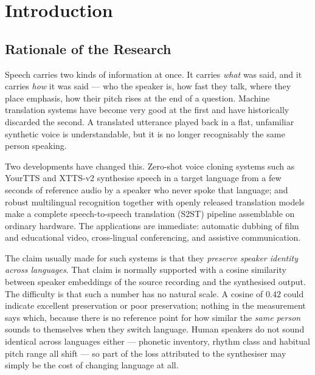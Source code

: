 \chapter{Introduction}
\label{ch:introduction}

\section{Rationale of the Research}
\label{sec:rationale}

Speech carries two kinds of information at once. It carries \emph{what} was said, and it carries
\emph{how} it was said --- who the speaker is, how fast they talk, where they place emphasis, how
their pitch rises at the end of a question. Machine translation systems have become very good at
the first and have historically discarded the second. A translated utterance played back in a flat,
unfamiliar synthetic voice is understandable, but it is no longer recognisably the same person
speaking.

Two developments have changed this. Zero-shot voice cloning systems such as
YourTTS \cite{casanova2022yourtts} and XTTS-v2 \cite{casanova2024xtts} synthesise speech in a
target language from a few seconds of reference audio by a speaker who never spoke that language;
and robust multilingual recognition \cite{radford2023whisper} together with openly released
translation models \cite{tiedemann2020opusmt} make a complete speech-to-speech translation (S2ST)
pipeline assemblable on ordinary hardware. The applications are immediate: automatic dubbing of
film and educational video, cross-lingual conferencing, and assistive communication.

The claim usually made for such systems is that they \emph{preserve speaker identity across
languages}. That claim is normally supported with a cosine similarity between speaker embeddings of
the source recording and the synthesised output. The difficulty is that such a number has no natural
scale. A cosine of $0.42$ could indicate excellent preservation or poor preservation; nothing in the
measurement says which, because there is no reference point for how similar the \emph{same person}
sounds to themselves when they switch language. Human speakers do not sound identical across
languages either --- phonetic inventory, rhythm class and habitual pitch range all shift --- so
part of the loss attributed to the synthesiser may simply be the cost of changing language at all.

